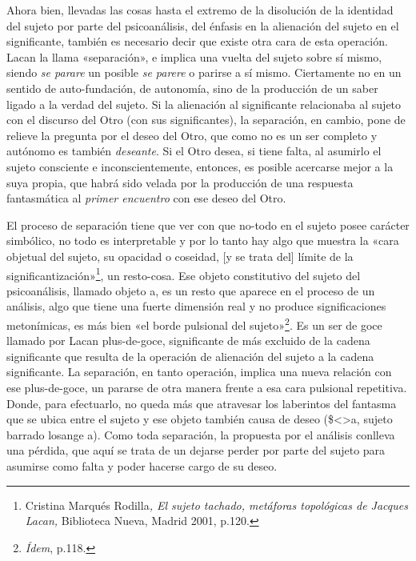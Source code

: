 Ahora bien, llevadas las cosas hasta el extremo de la disolución de la identidad del sujeto por parte del psicoanálisis, del énfasis en la alienación del sujeto en el significante, también es necesario decir que existe otra cara de esta operación. Lacan la llama «separación», e implica una vuelta del sujeto sobre sí mismo, siendo \emph{se parare} un posible \emph{se parere} o parirse a sí mismo. Ciertamente no en un sentido de auto-fundación, de autonomía, sino de la producción de un saber ligado a la verdad del sujeto. Si la alienación al significante relacionaba al sujeto con el discurso del Otro (con sus significantes), la separación, en cambio, pone de relieve la pregunta por el deseo del Otro, que como no es un ser completo y autónomo es también \emph{deseante}. Si el Otro desea, si tiene falta, al asumirlo el sujeto consciente e inconscientemente, entonces, es posible acercarse mejor a la suya propia, que habrá sido velada por la producción de una respuesta fantasmática al \emph{primer encuentro} con ese deseo del Otro.

El proceso de separación tiene que ver con que no-todo en el sujeto posee carácter simbólico, no todo es interpretable y por lo tanto hay algo que muestra la «cara objetual del sujeto, su opacidad o coseidad, {[}y se trata del{]} límite de la significantización»\footnote{Cristina Marqués Rodilla\emph{, El sujeto tachado, metáforas topológicas de Jacques Lacan,} Biblioteca Nueva, Madrid 2001, p.120.}, un resto-cosa. Ese objeto constitutivo del sujeto del psicoanálisis, llamado objeto a, es un resto que aparece en el proceso de un análisis, algo que tiene una fuerte dimensión real y no produce significaciones metonímicas, es más bien «el borde pulsional del sujeto»\footnote{\emph{Ídem}, p.118.}. Es un ser de goce llamado por Lacan plus-de-goce, significante de más excluido de la cadena significante que resulta de la operación de alienación del sujeto a la cadena significante. La separación, en tanto operación, implica una nueva relación con ese plus-de-goce, un pararse de otra manera frente a esa cara pulsional repetitiva. Donde, para efectuarlo, no queda más que atravesar los laberintos del fantasma que se ubica entre el sujeto y ese objeto también causa de deseo (\$\textless\textgreater a, sujeto barrado losange a). Como toda separación, la propuesta por el análisis conlleva una pérdida, que aquí se trata de un dejarse perder por parte del sujeto para asumirse como falta y poder hacerse cargo de su deseo.

